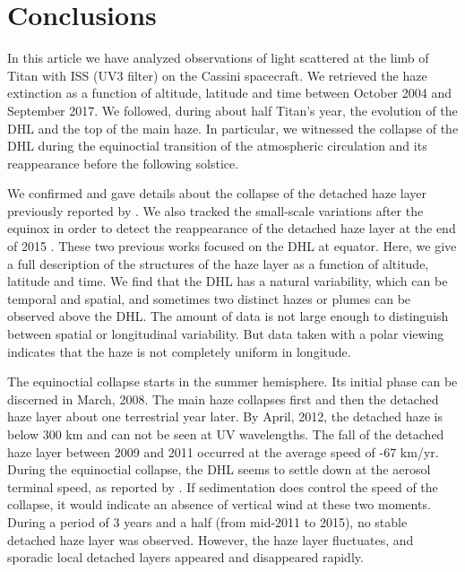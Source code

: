 \section{Conclusions}

In this article we have analyzed observations of light scattered at the limb of Titan with ISS (UV3 filter) on the
Cassini spacecraft. We retrieved the haze extinction as a function of altitude, latitude and time between October 2004 and
September 2017. We followed, during about half Titan's year, the evolution of the DHL and the top of the
main haze. In particular, we witnessed the collapse of the DHL during the equinoctial transition of the atmospheric
circulation and its reappearance before the following solstice.

We confirmed and gave details about the collapse of the detached haze layer previously reported by \cite{West2011}.
We also tracked the small-scale variations after the equinox in order to detect the reappearance of the detached haze
layer at the end of 2015 \citep{West2018}. These two previous works focused on the DHL at equator. Here, we give
a full description of the structures of the haze layer as a function of altitude, latitude and time. We find
that the DHL has a natural variability, which can be temporal and spatial, and sometimes two distinct hazes or plumes
can be observed above the DHL. The amount of data is not large enough to distinguish between spatial or
longitudinal variability. But data taken with a polar viewing indicates that the haze is not completely
uniform in longitude.

The equinoctial collapse starts in the summer hemisphere. Its initial phase can be discerned in March, 2008.
The main haze collapses first and then the detached haze layer about one terrestrial year later. By April, 2012,
the detached haze is below 300 km and can not be seen at UV wavelengths.
The fall of the detached haze layer between 2009 and 2011 occurred at the average speed of -67 km/yr.
During the equinoctial collapse, the DHL seems to settle down at the aerosol terminal speed,
as reported by \cite{West2018}. If sedimentation does control the speed of the collapse,
it would indicate an absence of vertical wind at these two moments.
During a period of 3 years and a half (from mid-2011 to 2015), no stable detached haze layer was observed.
However, the haze layer fluctuates, and sporadic local detached layers appeared and disappeared rapidly.

